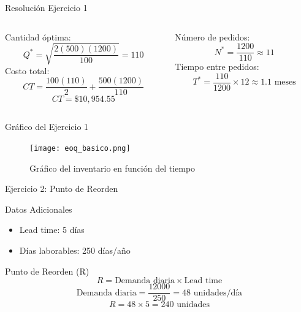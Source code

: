 \documentclass{beamer}
\begin{document}
\begin{frame}{Resolución Ejercicio 1}
    \begin{columns}[T]
        \begin{column}{0.5\textwidth}
            \textcolor{primary}{Cantidad óptima:}
            \[ Q^* = \sqrt{\frac{2(500)(1200)}{100}} = 110 \]
            \vspace{0.5cm}
            \textcolor{primary}{Costo total:}
            \[ CT = \frac{100(110)}{2} + \frac{500(1200)}{110} \]
            \[ CT = \$10,954.55 \]
        \end{column}
        \begin{column}{0.5\textwidth}
            \textcolor{primary}{Número de pedidos:}
            \[ N^* = \frac{1200}{110} \approx 11 \]
            \vspace{0.5cm}
            \textcolor{primary}{Tiempo entre pedidos:}
            \[ T^* = \frac{110}{1200} \times 12 \approx 1.1 \text{ meses} \]
        \end{column}
    \end{columns}
\end{frame}

\begin{frame}{Gráfico del Ejercicio 1}
    \begin{figure}
        \centering
        \texttt{[image: eoq\_basico.png]}
        \caption{Gráfico del inventario en función del tiempo}
    \end{figure}
\end{frame}

\begin{frame}{Ejercicio 2: Punto de Reorden}
    \begin{block}{Datos Adicionales}
        \begin{itemize}
            \item Lead time: 5 días
            \item Días laborables: 250 días/año
        \end{itemize}
    \end{block}
    \pause
    \begin{alertblock}{Punto de Reorden (R)}
        \vspace{0.2cm}
        \[ R = \text{Demanda diaria} \times \text{Lead time} \]
        \[ \text{Demanda diaria} = \frac{12000}{250} = 48 \text{ unidades/día} \]
        \[ R = 48 \times 5 = 240 \text{ unidades} \]
    \end{alertblock}
\end{frame}
\end{document}
